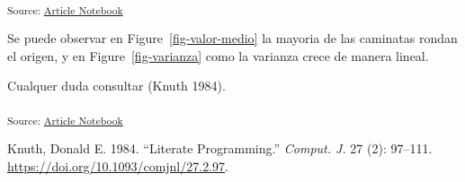 \documentclass[
  letterpaper,
  DIV=11,
  numbers=noendperiod]{scrartcl}
\newlength{\cslhangindent}
\newenvironment{CSLReferences}[2] %
 {\begin{list}{}{%
  \setlength{\itemindent}{0pt}
  \setlength{\leftmargin}{0pt}
  \setlength{\parsep}{0pt}
  \ifodd #1
   \setlength{\leftmargin}{\cslhangindent}
   \setlength{\itemindent}{-1\cslhangindent}
  \fi
  \setlength{\itemsep}{#2\baselineskip}}}
 {\end{list}}
\begin{document}
\textsubscript{Source:
\href{https://akielbowicz.github.io/pyday-la-plata-2024/index.qmd.html}{Article
Notebook}}

Se puede observar en Figure~\ref{fig-valor-medio} la mayoria de las
caminatas rondan el origen, y en Figure~\ref{fig-varianza} como la
varianza crece de manera lineal.

Cualquer duda consultar (Knuth 1984).

\textsubscript{Source:
\href{https://akielbowicz.github.io/pyday-la-plata-2024/index.qmd.html}{Article
Notebook}}

\label{refs}
\begin{CSLReferences}{1}{0}
Knuth, Donald E. 1984. {``Literate Programming.''} \emph{Comput. J.} 27
(2): 97--111. \url{https://doi.org/10.1093/comjnl/27.2.97}.

\end{CSLReferences}
\end{document}
